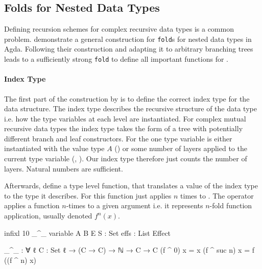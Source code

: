 \subsection{Folds for Nested Data Types}
\label{scoped-algebra:fold}

Defining recursion schemes for complex recursive data types is a common problem.
\textcite{DBLP:journals/corr/abs-1806-05230} demonstrate a general construction
for \texttt{fold}s for nested data types in Agda.
Following their construction and adapting it to arbitrary branching trees leads
to a sufficiently strong \texttt{fold} to define all important functions for
\AgdaSpace{}\AgdaSpace{}.

\paragraph{Index Type} The first part of the construction by
\textcite{DBLP:journals/corr/abs-1806-05230} is to define the correct index type
for the data structure.
The index type describes the recursive structure of the data type i.e. how the
type variables at each level are instantiated.
For complex mutual recursive data types the index type takes the form of a tree
with potentially different branch and leaf constructors.
For \AgdaSpace{}
the one type variable is either instantiated with the value type $A$
() or some number of
\AgdaSpace{} layers applied to
the current type variable (,
).
Our index type therefore just counts the number of
\AgdaSpace{} layers.
Natural numbers are sufficient.

Afterwards, \textcite{DBLP:journals/corr/abs-1806-05230} define a type level
function, that translates a value of the index type to the type it describes.
For
\AgdaSpace{}\AgdaSpace{}
this function just applies \AgdaSpace{}
$n$ times to .
The operator \AgdaFunction{\_\textasciicircum\_} applies a function $n$-times to
a given argument  i.e. it represents $n$-fold function
application, usually denoted $f^n(x)$.

\begin{code}[hide]
infixl 10 _^_
variable
  A B E S : Set
  effs : List Effect
\end{code}
\begin{code}
_^_ : ∀ {ℓ} {C : Set ℓ} → (C → C) → ℕ → C → C
(f ^ 0)      x = x
(f ^ suc n)  x = f ((f ^ n) x)
\end{code}

